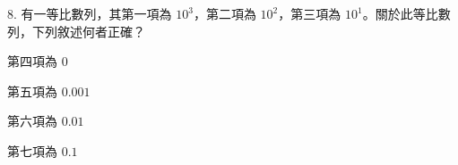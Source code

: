 \documentclass[12pt]{article}
\begin{document}
\begin{problem}
  \item[8.] 有一等比數列，其第一項為 $10^3$，第二項為 $10^2$，第三項為 $10^1$。關於此等比數列，下列敘述何者正確？
  \begin{choices}
    \item 第四項為 $0$
    \item 第五項為 $0.001$
    \item 第六項為 $0.01$
    \item 第七項為 $0.1$
  \end{choices}
\end{problem}
\end{document}
